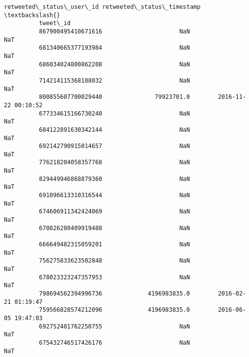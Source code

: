 \documentclass[11pt]{article}
\begin{document}
\begin{Verbatim}[commandchars=\\\{\}]
                             retweeted\_status\_user\_id retweeted\_status\_timestamp  \textbackslash{}
          tweet\_id                                                                 
          867900495410671616                      NaN                        NaT   
          681340665377193984                      NaN                        NaT   
          686034024800862208                      NaN                        NaT   
          714214115368108032                      NaN                        NaT   
          800855607700029440               79923701.0        2016-11-22 00:10:52   
          677334615166730240                      NaN                        NaT   
          684122891630342144                      NaN                        NaT   
          692142790915014657                      NaN                        NaT   
          776218204058357768                      NaN                        NaT   
          829449946868879360                      NaN                        NaT   
          691096613310316544                      NaN                        NaT   
          674606911342424069                      NaN                        NaT   
          670826280409919488                      NaN                        NaT   
          666649482315059201                      NaN                        NaT   
          756275833623502848                      NaN                        NaT   
          678023323247357953                      NaN                        NaT   
          798694562394996736             4196983835.0        2016-02-21 01:19:47   
          759566828574212096             4196983835.0        2016-06-05 19:47:03   
          692752401762250755                      NaN                        NaT   
          675432746517426176                      NaN                        NaT   
          

\end{Verbatim}
\end{document}
